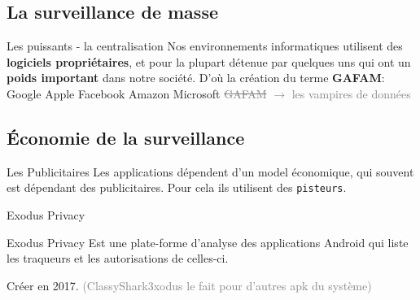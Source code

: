 \documentclass[aspectratio=169]{beamer}
\begin{document}
\subsection{La surveillance de masse}

\begin{frame}
\begin{center}
\large{\color{cvp}{La surveillance de masse}}
\end{center}
\end{frame}

\begin{frame}{Les puissants - la centralisation}
Nos environnements informatiques utilisent des \textbf{logiciels propriétaires},\newline
et pour la plupart détenue par quelques uns qui ont un \textbf{poids important} dans notre société. \newline
\newline
D'où la création du terme \textbf{GAFAM}: Google Apple Facebook Amazon Microsoft\newline
\newline
\textcolor{gray}{\tiny{\sout{GAFAM} $\to$ les vampires de données}}
\end{frame}

\subsection{Économie de la surveillance}

\begin{frame}
\begin{center}
\large{\color{cvp}{Économie de la surveillance}}
\end{center}
\end{frame}

\begin{frame}{Les Publicitaires}
Les applications dépendent d'un model économique, qui souvent est dépendant des publicitaires.\newline
\newline
Pour cela ils utilisent des \texttt{pisteurs}.
\end{frame}

\begin{frame}{Exodus Privacy}
\begin{block}{Exodus Privacy}
Est une plate-forme d'analyse des applications Android qui liste les traqueurs et les autorisations de celles-ci.
\end{block}
Créer en 2017.\newline
\newline
\newline
\textcolor{gray}{\tiny{(ClassyShark3xodus le fait pour d'autres apk du système)}}
\end{frame}
\end{document}

